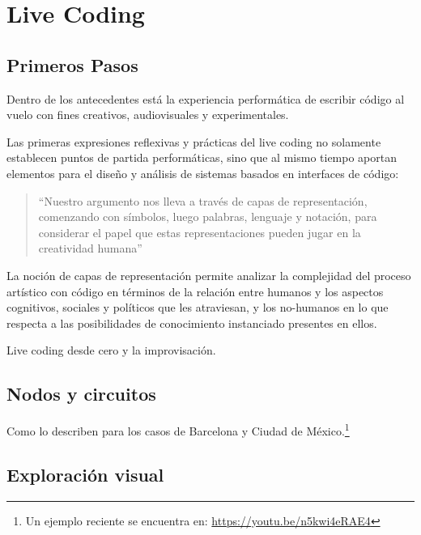 \section{Live Coding}


\subsection{Primeros Pasos}

Dentro de los antecedentes está la experiencia performática de escribir código al vuelo con fines creativos, audiovisuales y experimentales.

Las primeras expresiones reflexivas y prácticas del live coding no solamente establecen puntos de partida performáticas, sino que al mismo tiempo aportan elementos para el diseño y análisis de sistemas basados en interfaces de código:

\begin{quote}

  ``Nuestro argumento nos lleva a través de capas de representación, comenzando con símbolos, luego palabras, lenguaje y notación, para considerar el papel que estas representaciones pueden jugar en la creatividad humana'' \citep[p.~3]{McLean2011}

\end{quote}

  
La noción de capas de representación permite analizar la complejidad del proceso artístico con código en términos de la relación entre humanos y los aspectos cognitivos, sociales y políticos que les atraviesan, y los no-humanos en lo que respecta a las posibilidades de conocimiento instanciado presentes en ellos. 

Live coding desde cero y la improvisación. 

\subsection{Nodos y circuitos}

Como lo describen \cite{villasenor} para los casos de Barcelona y Ciudad de México.\footnote{Un ejemplo reciente se encuentra en: \url{https://youtu.be/n5kwi4eRAE4}} 

\subsection{Exploración visual}

